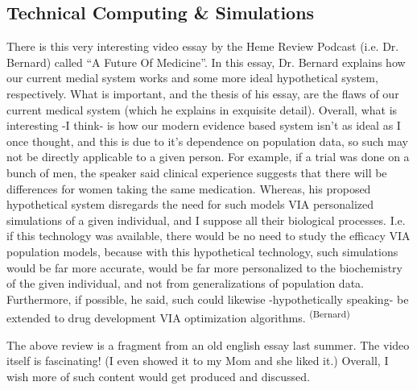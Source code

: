 \subsection*{Technical Computing \& Simulations}

There is this very interesting video essay by the Heme Review Podcast (i.e.  Dr. Bernard) called ``A Future Of Medicine''. In this essay, Dr. Bernard explains how our current medial system works and some more ideal hypothetical system, respectively. What is important, and the thesis of his essay, are the flaws of our current medical system (which he explains in exquisite detail). Overall, what is interesting -I think- is how our modern evidence based system isn’t as ideal as I once thought, and this is due to it’s dependence on population data, so such may not be directly applicable to a given person. For example, if a trial was done on a bunch of men, the speaker said clinical experience suggests that there will be differences for women taking the same medication. Whereas, his proposed hypothetical system disregards the need for such models VIA personalized simulations of a given individual, and I suppose all their biological processes. I.e. if this technology was available, there would be no need to study the efficacy VIA population models, because with this hypothetical technology, such simulations would be far more accurate, would be far more personalized to the biochemistry of the given individual, and not from generalizations of population data. Furthermore, if possible, he said, such could likewise -hypothetically speaking- be extended to drug development VIA optimization algorithms. \textsuperscript{(Bernard)}


The above review is a fragment from an old english essay last summer. The video itself is fascinating! (I even showed it to my Mom and she liked it.) Overall, I wish more of such content would get produced and discussed.

